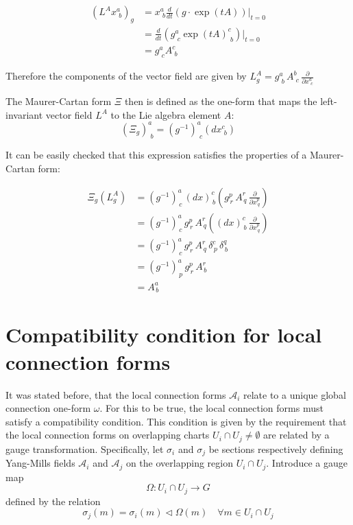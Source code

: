 \begin{align*}
  \left( L^A x^a_{\,\,b} \right)_g &= x^a_{\,\,b} \frac{d}{dt} \left( g \cdot \exp(tA) \right) \bigg|_{t=0} \\
  &= \frac{d}{dt} \left( g^a_{\,\,c} \exp(tA)^c_{\,\,b} \right) \bigg|_{t=0} \\
  &= g^a_{\,\,c} A^c_{\,\,b}
\end{align*}


Therefore the components of the vector field are given by \( L^A_g = g^a_{\,\,b} \, A^b_{\,\,c} \, \frac{\partial}{\partial x^a_{\,\,c}} \)\cite{FredericSchullerLocalrepresentationsconnectionbasemanifoldYangMillsfieldsLec222015}

The Maurer-Cartan form $\Xi$ then is defined as the one-form that maps the left-invariant vector field \( L^A \) to the Lie algebra element \( A \):
\[ (\Xi_g)^a_{\,\,b} = (g^{-1})^a_{\,\,c}(dx^c_{\,\,b}) \]

It can be easily checked that this expression satisfies the properties of a Maurer-Cartan form:

\begin{align*}
  \Xi_g(L^A_g) 
  &= (g^{-1})^a_{\,c} \, (dx)^c_{\,b} \left( g^p_{\,r} \, A^r_{\,q} \, \frac{\partial}{\partial x^p_{\,q}} \right) \\
  &= (g^{-1})^a_{\,c} \, g^p_{\,r} \, A^r_{\,q} \left( (dx)^c_{\,b} \, \frac{\partial}{\partial x^p_{\,q}} \right) \\
  &= (g^{-1})^a_{\,c} \, g^p_{\,r} \, A^r_{\,q} \, \delta^c_{\,p} \, \delta^q_{\,b} \\
  &= (g^{-1})^a_{\,p} \, g^p_{\,r} \, A^r_{\,b} \\
  &= A^a_{\,b}
\end{align*}


\section{Compatibility condition for local connection forms}


It was stated before, that the local connection forms $\mathcal{A}_i$ relate to a unique global connection one-form $\omega$. For this to be true, the local connection forms must satisfy a compatibility condition. This condition is given by the requirement that the local connection forms on overlapping charts \( U_i \cap U_j \neq \emptyset\) are related by a gauge transformation\cite{NakaharaGeometrytopologyphysics2005}. Specifically, let $\sigma_i$ and $\sigma_j$ be sections respectively defining Yang-Mills fields \( \mathcal{A}_i \) and \( \mathcal{A}_j \) on the overlapping region \( U_i \cap U_j \). Introduce a gauge map
\[ \Omega : U_i \cap U_j \longrightarrow G \]
defined by the relation
\[ \sigma_j(m) = \sigma_i(m) \triangleleft \Omega(m) \quad \forall m \in U_i \cap U_j \]


